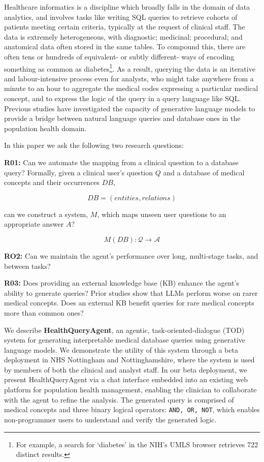 \documentclass[11pt]{article}
\begin{document}
Healthcare informatics is a discipline which broadly falls in the domain of data analytics, and involves tasks like writing SQL queries to retrieve cohorts of patients meeting certain criteria, typically at the request of clinical staff.
The data is extremely heterogeneous, with diagnostic; medicinal; procedural; and anatomical data often stored in the same tables.
To compound this, there are often tens or hundreds of equivalent- or subtly different- ways of encoding something as common as diabetes\footnote{For example, a search for `diabetes' in the NIH's UMLS browser retrieves 722 distinct results.}.
As a result, querying the data is an iterative and labour-intensive process even for analysts, who might take anywhere from a minute to an hour to aggregate the medical codes expressing a particular medical concept, and to express the logic of the query in a query language like SQL. Previous studies have investigated the capacity of generative language models to provide a bridge between natural language queries and database ones in the population health domain.

In this paper we ask the following two research questions:

\textbf{R01:} Can we automate the mapping from a clinical question to a database query? Formally, given a clinical user's question $Q$ and a database of medical concepts and their occurrences $DB$,

  $$ DB = (entities, relations) $$

can we construct a system, $M$, which maps unseen user questions to an appropriate answer $A$?

  $$ M(DB): \mathcal{Q} \rightarrow \mathcal{A} $$

\textbf{RO2:} Can we maintain the agent's performance over long, multi-stage tasks, and between tasks?

\textbf{R03:} Does providing an external knowledge base (KB) enhance the agent's ability to generate queries? Prior studies show that LLMs perform worse on rarer medical concepts. Does an external KB benefit queries for rare medical concepts more than common ones?

We describe \textbf{HealthQueryAgent}, an agentic, task-oriented-dialogue (TOD) system for generating interpretable medical database queries using generative language models. We demonstrate the utility of this system through a beta deployment in NHS Nottingham and Nottinghamshire, where the system is used by members of both the clinical and analyst staff.
In our beta deployment, we present HealthQueryAgent via a chat interface embedded into an existing web platform for population health management, enabling the clinician to collaborate with the agent to refine the analysis.
The generated query is comprised of medical concepts and three binary logical operators: \texttt{AND, OR, NOT}, which enables non-programmer users to understand and verify the generated logic.
\end{document}
